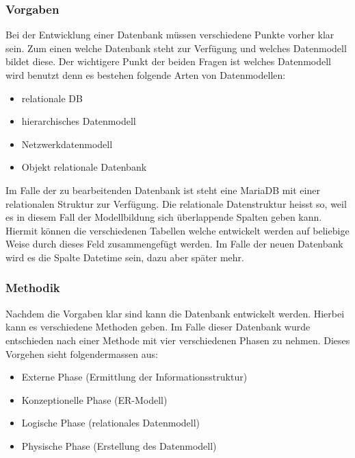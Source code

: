 \subsubsection{Vorgaben}
Bei der Entwicklung einer Datenbank müssen verschiedene Punkte vorher klar sein. Zum einen welche Datenbank steht zur Verfügung und welches Datenmodell bildet diese. Der wichtigere Punkt der beiden Fragen ist welches Datenmodell wird benutzt denn es bestehen folgende Arten von Datenmodellen:
\begin{itemize}
\item relationale DB
\item hierarchisches Datenmodell
\item Netzwerkdatenmodell
\item Objekt relationale Datenbank
\end{itemize}

Im Falle der zu bearbeitenden Datenbank ist steht eine MariaDB mit einer relationalen Struktur zur Verfügung. Die relationale Datenstruktur heisst so, weil es in diesem Fall der Modellbildung sich überlappende Spalten geben kann.\cite{IntroductionToRelationalDatabases:MariaDB} Hiermit können die verschiedenen Tabellen welche entwickelt werden auf beliebige Weise durch dieses Feld zusammengefügt werden. Im Falle der neuen Datenbank wird es die Spalte Datetime sein, dazu aber später mehr.\\

\subsubsection{Methodik}
Nachdem die Vorgaben klar sind kann die Datenbank entwickelt werden. Hierbei kann es verschiedene Methoden geben. Im Falle dieser Datenbank wurde entschieden nach einer Methode mit vier verschiedenen Phasen zu nehmen. \cite{Datenbanken:GrundlagenUndEntwurf:VeikkoKrypczyk} Dieses Vorgehen sieht folgendermassen aus:
\begin{itemize}
\item Externe Phase (Ermittlung der Informationsstruktur)
\item Konzeptionelle Phase (ER-Modell)
\item Logische Phase (relationales Datenmodell)
\item Physische Phase (Erstellung des Datenmodell)
\end{itemize}
